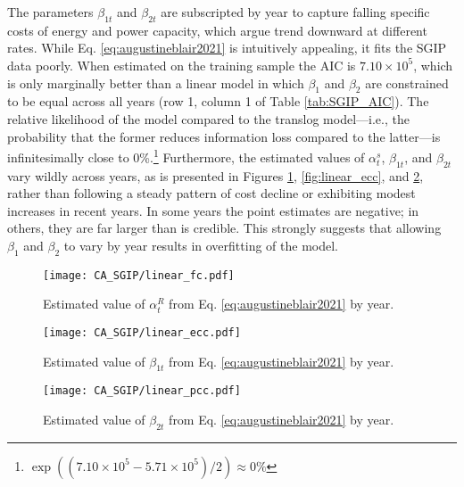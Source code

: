 The parameters $\beta_{1t}$ and $\beta_{2t}$ are subscripted by year to capture falling specific costs of energy and power capacity, which \citeauthor{augustineblair2021} argue trend downward at different rates. While Eq. \ref{eq:augustineblair2021} is intuitively appealing, it fits the SGIP data poorly. When estimated on the training sample the AIC is $7.10 \times 10^5 $, which is only marginally better than a linear model in which $\beta_{1}$ and $\beta_{2}$ are constrained to be equal across all years (row 1, column 1 of Table \ref{tab:SGIP_AIC}). The relative likelihood of the \citet{augustineblair2021} model compared to the translog model---i.e., the probability that the former reduces information loss compared to the latter---is infinitesimally close to 0\%.\footnote{$\exp((7.10 \times 10^5 - 5.71 \times 10^5)/2) \approx 0\% $} Furthermore, the estimated values of $\alpha^{s}_{t}$, $\beta_{1t}$, and $\beta_{2t}$ vary wildly across years, as is presented in Figures \ref{fig:linear_fc}, \ref{fig:linear_ecc}, and \ref{fig:linear_pcc}, rather than following a steady pattern of cost decline or exhibiting modest increases in recent years. In some years the point estimates are negative; in others, they are far larger than is credible. This strongly suggests that allowing $\beta_{1}$ and $\beta_{2}$ to vary by year results in overfitting of the model.

\begin{figure}[b!]
\centering
\texttt{[image: CA\_SGIP/linear\_fc.pdf]}
\caption{Estimated value of $\alpha^{R}_{t}$ from Eq. \ref{eq:augustineblair2021} by year.}\label{fig:linear_fc}
\end{figure}

\begin{figure}[p]
\centering
\texttt{[image: CA\_SGIP/linear\_ecc.pdf]}
\caption{Estimated value of $\beta_{1t}$ from Eq. \ref{eq:augustineblair2021} by year.}\label{fig:linear_ecc}

\texttt{[image: CA\_SGIP/linear\_pcc.pdf]}
\caption{Estimated value of $\beta_{2t}$ from Eq. \ref{eq:augustineblair2021} by year.}\label{fig:linear_pcc}
\end{figure}